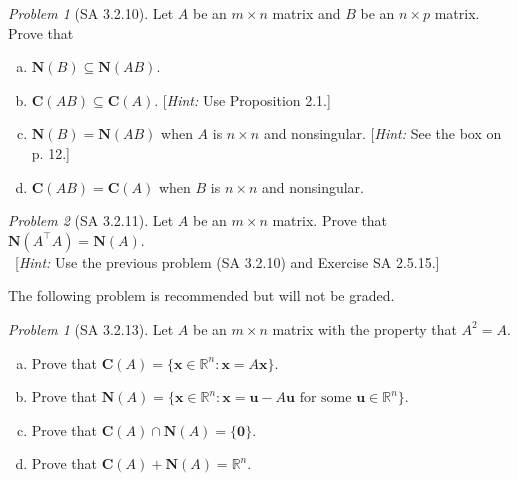 \documentclass[fleqn,11pt]{paper}
\theoremstyle{remark}
\newtheorem{problem}{Problem}
\newtheorem*{prob}{Problem}
\newtheorem*{solution}{{\bf Solution}}
\newcommand\R{\fld{R}}
\renewcommand{\vec}[1]{\mathbf{#1}}
\newcommand{\<}{\ensuremath{\langle}}
\renewcommand{\>}{\ensuremath{\rangle}}
\newcommand\fld[1]{\ensuremath{\mathbb{#1}}}
\newcommand\vu{\vec{u}}
\newcommand\vx{\vec{x}}
\newcommand\vzero{\vec{0}}
\newcommand\bN{\ensuremath{\mathbf N}}
\newcommand\bC{\ensuremath{\mathbf C}}
\begin{document}
\newpage

\begin{problem}[SA 3.2.10]
Let $A$ be an $m \times n$ matrix and $B$ be an $n \times p$ matrix. Prove that
\begin{enumerate}[a.]
\item $\bN(B) \subseteq \bN(AB)$.
\item $\bC(AB) \subseteq \bC(A)$. [{\it Hint:} Use Proposition 2.1.]
\item $\bN(B) = \bN(AB)$ when $A$ is $n \times n$ and nonsingular. [{\it Hint:} See the box on p. 12.]
\item $\bC(AB) = \bC(A)$ when $B$ is $n \times n$ and nonsingular.
\end{enumerate}
\end{problem}

\newpage

\begin{problem}[SA 3.2.11]
Let $A$ be an $m \times n$ matrix. Prove that $\bN(A^{\top} A) = \bN(A)$. \\
~[{\it Hint:} Use the previous problem (SA 3.2.10) and Exercise SA 2.5.15.]
\end{problem}

\newpage

\noindent The following problem is recommended but will not be graded.
\begin{prob}[SA 3.2.13]
Let $A$ be an $m \times n$ matrix with the property that $A^2 = A$.
\begin{enumerate}[a.]
\item Prove that $\bC(A) = \{\vx \in \R^n : \vx = A\vx\}$.
\item Prove that $\bN(A) = \{\vx \in \R^n : \vx= \vu - A\vu \text{ for some } \vu \in \R^n \}$.
\item Prove that $\bC(A) \cap \bN(A) = \{\vzero\}$.
\item Prove that $\bC(A) + \bN(A) = \R^n$.
\end{enumerate}
\end{prob}
\end{document}
